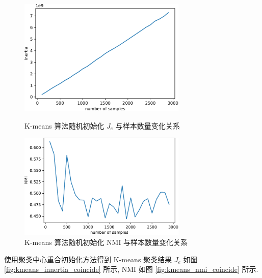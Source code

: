 \documentclass{article}
\begin{document}
\begin{figure}[htbp]
  \centering
  \begin{minipage}[t]{0.48\textwidth}
    \centering
    \includegraphics[width=8cm]{kmeans_innertia.pdf}
    \caption{K-means 算法随机初始化 $J_e$ 与样本数量变化关系}
    \label{fig:kmeans_innertia}
  \end{minipage}
  \begin{minipage}[t]{0.48\textwidth}
    \centering
    \includegraphics[width=8cm]{kmeans_nmi.pdf}
    \caption{K-means 算法随机初始化 NMI 与样本数量变化关系}
    \label{fig:kmeans_nmi}
  \end{minipage}
\end{figure}

使用聚类中心重合初始化方法得到 K-means 聚类结果 $J_e$ 如图 \ref{fig:kmeans_innertia_coincide} 所示, NMI 如图 \ref{fig:kmeans_nmi_coincide} 所示.
\end{document}
